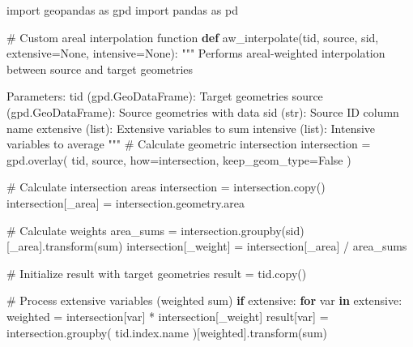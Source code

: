 \documentclass[
  letterpaper,
  DIV=11,
  numbers=noendperiod]{scrartcl}
\newenvironment{Shaded}{\begin{snugshade}}{\end{snugshade}}
\newcommand{\CommentTok}[1]{\textcolor[rgb]{0.37,0.37,0.37}{#1}}
\newcommand{\ControlFlowTok}[1]{\textcolor[rgb]{0.00,0.23,0.31}{\textbf{#1}}}
\newcommand{\ImportTok}[1]{\textcolor[rgb]{0.00,0.46,0.62}{#1}}
\newcommand{\KeywordTok}[1]{\textcolor[rgb]{0.00,0.23,0.31}{\textbf{#1}}}
\newcommand{\NormalTok}[1]{\textcolor[rgb]{0.00,0.23,0.31}{#1}}
\newcommand{\OperatorTok}[1]{\textcolor[rgb]{0.37,0.37,0.37}{#1}}
\newcommand{\StringTok}[1]{\textcolor[rgb]{0.13,0.47,0.30}{#1}}
\newcommand{\VariableTok}[1]{\textcolor[rgb]{0.07,0.07,0.07}{#1}}
\begin{document}
\begin{Shaded}
\begin{Highlighting}[]
\ImportTok{import}\NormalTok{ geopandas }\ImportTok{as}\NormalTok{ gpd}
\ImportTok{import}\NormalTok{ pandas }\ImportTok{as}\NormalTok{ pd}

\CommentTok{\# Custom areal interpolation function}
\KeywordTok{def}\NormalTok{ aw\_interpolate(tid, source, sid, extensive}\OperatorTok{=}\VariableTok{None}\NormalTok{, intensive}\OperatorTok{=}\VariableTok{None}\NormalTok{):}
    \CommentTok{"""}
\CommentTok{    Performs areal{-}weighted interpolation between source and target geometries}

\CommentTok{    Parameters:}
\CommentTok{    tid (gpd.GeoDataFrame): Target geometries}
\CommentTok{    source (gpd.GeoDataFrame): Source geometries with data}
\CommentTok{    sid (str): Source ID column name}
\CommentTok{    extensive (list): Extensive variables to sum}
\CommentTok{    intensive (list): Intensive variables to average}
\CommentTok{    """}
    \CommentTok{\# Calculate geometric intersection}
\NormalTok{    intersection }\OperatorTok{=}\NormalTok{ gpd.overlay(}
\NormalTok{        tid, source, how}\OperatorTok{=}\StringTok{\textquotesingle{}intersection\textquotesingle{}}\NormalTok{, keep\_geom\_type}\OperatorTok{=}\VariableTok{False}
\NormalTok{    )}

    \CommentTok{\# Calculate intersection areas}
\NormalTok{    intersection }\OperatorTok{=}\NormalTok{ intersection.copy()}
\NormalTok{    intersection[}\StringTok{\textquotesingle{}\_area\textquotesingle{}}\NormalTok{] }\OperatorTok{=}\NormalTok{ intersection.geometry.area}

    \CommentTok{\# Calculate weights}
\NormalTok{    area\_sums }\OperatorTok{=}\NormalTok{ intersection.groupby(sid)[}\StringTok{\textquotesingle{}\_area\textquotesingle{}}\NormalTok{].transform(}\StringTok{\textquotesingle{}sum\textquotesingle{}}\NormalTok{)}
\NormalTok{    intersection[}\StringTok{\textquotesingle{}\_weight\textquotesingle{}}\NormalTok{] }\OperatorTok{=}\NormalTok{ intersection[}\StringTok{\textquotesingle{}\_area\textquotesingle{}}\NormalTok{] }\OperatorTok{/}\NormalTok{ area\_sums}

    \CommentTok{\# Initialize result with target geometries}
\NormalTok{    result }\OperatorTok{=}\NormalTok{ tid.copy()}

    \CommentTok{\# Process extensive variables (weighted sum)}
    \ControlFlowTok{if}\NormalTok{ extensive:}
        \ControlFlowTok{for}\NormalTok{ var }\KeywordTok{in}\NormalTok{ extensive:}
\NormalTok{            weighted }\OperatorTok{=}\NormalTok{ intersection[var] }\OperatorTok{*}\NormalTok{ intersection[}\StringTok{\textquotesingle{}\_weight\textquotesingle{}}\NormalTok{]}
\NormalTok{            result[var] }\OperatorTok{=}\NormalTok{ intersection.groupby(}
\NormalTok{                tid.index.name}
\NormalTok{            )[weighted].transform(}\StringTok{\textquotesingle{}sum\textquotesingle{}}\NormalTok{)}


\end{Highlighting}
\end{Shaded}
\end{document}
